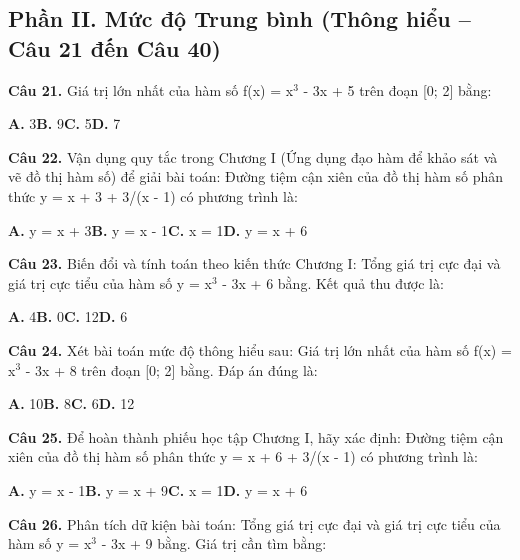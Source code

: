 \documentclass[11pt,a4paper]{article}
\begin{document}
\subsection*{\color{accent} Phần II. Mức độ Trung bình (Thông hiểu -- Câu 21 đến Câu 40)}
\textbf{\color{primary} Câu 21.} Giá trị lớn nhất của hàm số f(x) = x$^3$ - 3x + 5 trên đoạn [0; 2] bằng:\par
\hspace*{1.5em}\textbf{A.} 3\quad\quad \textbf{B.} 9\quad\quad \textbf{C.} 5\quad\quad \textbf{D.} 7\par\vspace{2pt}
\textbf{\color{primary} Câu 22.} Vận dụng quy tắc trong Chương I (Ứng dụng đạo hàm để khảo sát và vẽ đồ thị hàm số) để giải bài toán: Đường tiệm cận xiên của đồ thị hàm số phân thức y = x + 3 + 3/(x - 1) có phương trình là:\par
\hspace*{1.5em}\textbf{A.} y = x + 3\quad\quad \textbf{B.} y = x - 1\quad\quad \textbf{C.} x = 1\quad\quad \textbf{D.} y = x + 6\par\vspace{2pt}
\textbf{\color{primary} Câu 23.} Biến đổi và tính toán theo kiến thức Chương I: Tổng giá trị cực đại và giá trị cực tiểu của hàm số y = x$^3$ - 3x + 6 bằng. Kết quả thu được là:\par
\hspace*{1.5em}\textbf{A.} 4\quad\quad \textbf{B.} 0\quad\quad \textbf{C.} 12\quad\quad \textbf{D.} 6\par\vspace{2pt}
\textbf{\color{primary} Câu 24.} Xét bài toán mức độ thông hiểu sau: Giá trị lớn nhất của hàm số f(x) = x$^3$ - 3x + 8 trên đoạn [0; 2] bằng. Đáp án đúng là:\par
\hspace*{1.5em}\textbf{A.} 10\quad\quad \textbf{B.} 8\quad\quad \textbf{C.} 6\quad\quad \textbf{D.} 12\par\vspace{2pt}
\textbf{\color{primary} Câu 25.} Để hoàn thành phiếu học tập Chương I, hãy xác định: Đường tiệm cận xiên của đồ thị hàm số phân thức y = x + 6 + 3/(x - 1) có phương trình là:\par
\hspace*{1.5em}\textbf{A.} y = x - 1\quad\quad \textbf{B.} y = x + 9\quad\quad \textbf{C.} x = 1\quad\quad \textbf{D.} y = x + 6\par\vspace{2pt}
\textbf{\color{primary} Câu 26.} Phân tích dữ kiện bài toán: Tổng giá trị cực đại và giá trị cực tiểu của hàm số y = x$^3$ - 3x + 9 bằng. Giá trị cần tìm bằng:\par
\end{document}
